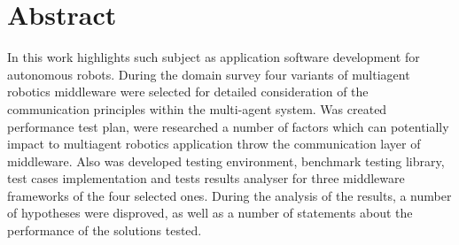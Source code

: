 \chapter*{Abstract}
In this work highlights such subject as application software development for autonomous robots. During the domain survey four variants of multiagent robotics middleware were selected for detailed consideration of the communication principles within the multi-agent system. Was created performance test plan, were researched a number of factors which can potentially impact to multiagent robotics application throw the communication layer of middleware. Also was developed testing environment, benchmark testing library, test cases implementation and tests results analyser for three middleware frameworks of the four selected ones. During the analysis of the results, a number of hypotheses were disproved, as well as a number of statements about the performance of the solutions tested.
